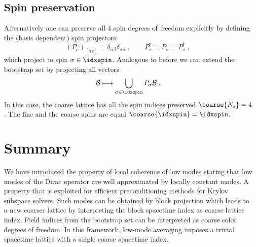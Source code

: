 \subsection{Spin preservation}

Alternatively one can preserve all \num{4} spin degrees of freedom explicitly by defining the (basis dependent) spin projectors
\begin{equation} \label{eq:spin:projectors}
(P_{\sigma})_{[\alpha \beta]} = \delta_{\alpha \beta} \delta_{\alpha \sigma} \;,
\qquad
P_{\sigma}^{2} = P_{\sigma} = P_{\sigma}^{\dagger} \;,
\end{equation}
which project to spin $\sigma \in \idxspin$.
Analogous to before we can extend the bootstrap set by projecting all vectors
\begin{equation} \label{eq:bootstrap:spin}
\mathcal{B} \longmapsto \bigcup_{\sigma \in \idxspin} P_{\sigma} \mathcal{B} \;.
\end{equation}
In this case, the coarse lattice has all the spin indices preserved $\coarse{N_s} = 4$.
The fine and the coarse spins are equal $\coarse{\idxspin} = \idxspin$.

\section{Summary}
\label{sec:lc:summary}

We have introduced the property of local coherence of low modes stating that low modes of the Dirac operator are well approximated by locally constant modes.
A property that is exploited for efficient preconditioning methods for Krylov subspace solvers.
Such modes can be obtained by block projection which leads to a new coarser lattice by interpreting the block spacetime index as coarse lattice index.
Field indices from the bootstrap set can be interpreted as coarse color degrees of freedom.
In this framework, low-mode averaging imposes a trivial spacetime lattice with a single coarse spacetime index.

